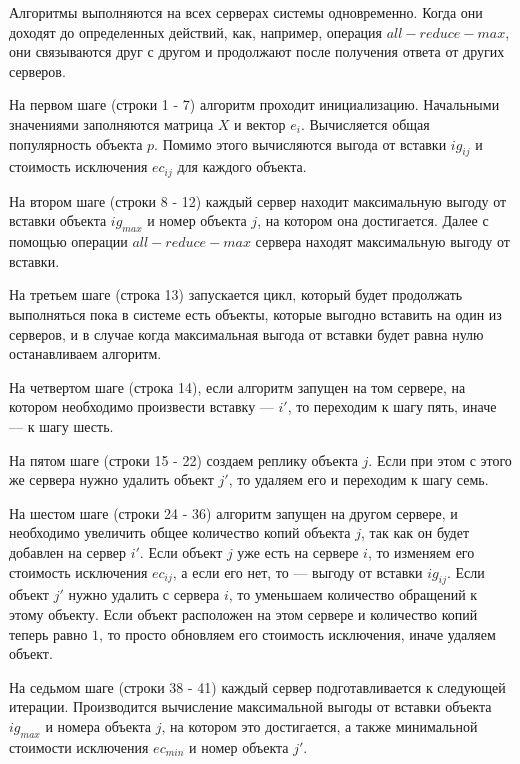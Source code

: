 			\newpage
			Алгоритмы выполняются на всех серверах системы одновременно. Когда они доходят до определенных действий, 
			как, например, операция $all-reduce-max$, они связываются друг с другом и продолжают после получения ответа 
			от других серверов.

			На первом шаге (строки 1 - 7) алгоритм проходит инициализацию. Начальными значениями заполняются матрица $X$ и вектор $e_i$.
			Вычисляется общая популярность объекта $p$. Помимо этого вычисляются выгода от вставки $ig_{ij}$ и стоимость 
			исключения $ec_{ij}$ для каждого объекта. 
			
			На втором шаге (строки 8 - 12) каждый сервер находит максимальную выгоду от вставки объекта $ig_{max}$ и 
			номер объекта $j$, на котором она достигается. Далее с помощью операции $all-reduce-max$ сервера находят максимальную 
			выгоду от вставки. 
			
			На третьем шаге (строка 13) запускается цикл, который будет продолжать выполняться пока в системе есть объекты, 
			которые выгодно вставить на один из серверов, и в случае когда максимальная выгода от вставки будет равна нулю останавливаем алгоритм. 
			
			На четвертом шаге (строка 14), если алгоритм запущен на том сервере, на котором необходимо произвести 
			вставку --- $i'$, то  переходим к шагу пять, иначе --- к шагу шесть.
			
			На пятом шаге (строки 15 - 22) создаем реплику объекта $j$. Если при этом с этого же сервера нужно удалить объект $j'$, то 
			удаляем его и переходим к шагу семь. 
			
			На шестом шаге (строки 24 - 36) алгоритм запущен на другом сервере, и необходимо увеличить общее количество копий объекта $j$, так как он
			будет добавлен на сервер $i'$. Если объект $j$ уже есть на сервере $i$, то изменяем его стоимость исключения $ec_{ij}$,
			а если его нет, то --- выгоду от вставки $ig_{ij}$. Если объект $j'$ нужно удалить с сервера $i$, то уменьшаем количество 
			обращений к этому объекту. Если объект расположен на этом сервере и количество копий теперь равно $1$, то просто обновляем
			его стоимость исключения, иначе удаляем объект. 
			
			На седьмом шаге (строки 38 - 41) каждый сервер подготавливается к следующей итерации.
			Производится вычисление максимальной выгоды от вставки объекта $ig_{max}$ и номера объекта $j$, на котором это достигается, а также 
			минимальной стоимости исключения $ec_{min}$ и номер объекта $j'$. 
			
